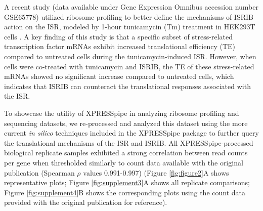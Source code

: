 \documentclass[10pt, oneside]{article}
\begin{document}
A recent study (data available under Gene Expression Omnibus accession number GSE65778) utilized ribosome profiling to better define the mechanisms of ISRIB action on the ISR, modeled by 1-hour tunicamycin (Tm) treatment in HEK293T cells \cite{isrib_riboseq}. A key finding of this study is that a specific subset of stress-related transcription factor mRNAs exhibit increased translational efficiency (TE) compared to untreated cells during the tunicamycin-induced ISR. However, when cells were co-treated with tunicamycin and ISRIB, the TE of these stress-related mRNAs showed no significant increase compared to untreated cells, which indicates that ISRIB can counteract the translational responses associated with the ISR. \par

To showcase the utility of XPRESSpipe in analyzing ribosome profiling and sequencing datasets, we re-processed and analyzed this dataset using the more current \textit{in silico} techniques included in the XPRESSpipe package to further query the translational mechanisms of the ISR and ISRIB. All XPRESSpipe-processed biological replicate samples exhibited a strong correlation between read counts per gene when thresholded similarly to count data available with the original publication (Spearman $\rho$ values 0.991-0.997) (Figure \ref{fig:figure2}A shows representative plots; Figure \ref{fig:supplement3}A shows all replicate comparisons; Figure \ref{fig:supplement4}B shows the corresponding plots using the count data provided with the original publication for reference).\par
\end{document}
